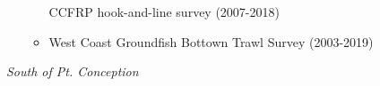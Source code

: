 \documentclass[11pt,
  english,
  a4paper,
]{article}
\begin{document}
\begin{itemize}
\begin{itemize}
    CCFRP hook-and-line survey (2007-2018)

    \tagmcend\tagstructend\tagstructend

    \tagmcend\tagstructend\tagstructend
  \item


    West Coast Groundfish Bottown Trawl Survey (2003-2019)

    \tagmcend\tagstructend\tagstructend

    \tagmcend\tagstructend\tagstructend
  \end{itemize}

  \tagstructend
\end{itemize}

\tagstructend

\emph{South of Pt. Conception}

\end{document}
